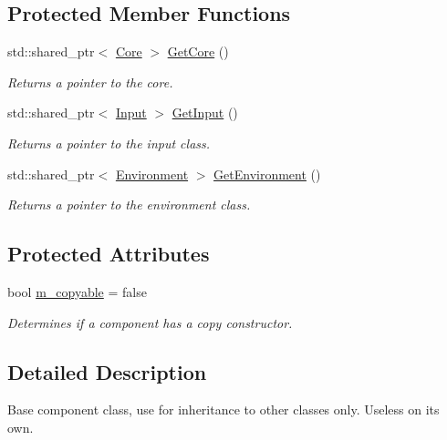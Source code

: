 \subsection*{Protected Member Functions}
\begin{DoxyCompactItemize}
\item 
std\+::shared\+\_\+ptr$<$ \hyperlink{classfrontier_1_1_core}{Core} $>$ \hyperlink{classfrontier_1_1_component_a0006685ddaadb379360f7f28294d3806}{Get\+Core} ()
\begin{DoxyCompactList}\small\item\em Returns a pointer to the core. \end{DoxyCompactList}\item 
std\+::shared\+\_\+ptr$<$ \hyperlink{classfrontier_1_1_input}{Input} $>$ \hyperlink{classfrontier_1_1_component_a25cc51fb97b0b4c5dad1401707d530ea}{Get\+Input} ()
\begin{DoxyCompactList}\small\item\em Returns a pointer to the input class. \end{DoxyCompactList}\item 
std\+::shared\+\_\+ptr$<$ \hyperlink{classfrontier_1_1_environment}{Environment} $>$ \hyperlink{classfrontier_1_1_component_a24846c0ac8d4d607aff483ed7ffdf5f8}{Get\+Environment} ()
\begin{DoxyCompactList}\small\item\em Returns a pointer to the environment class. \end{DoxyCompactList}\end{DoxyCompactItemize}
\subsection*{Protected Attributes}
\begin{DoxyCompactItemize}
\item 
bool \hyperlink{classfrontier_1_1_component_ad15af6da45dff3b37abb83bd5697fd87}{m\+\_\+copyable} = false
\begin{DoxyCompactList}\small\item\em Determines if a component has a copy constructor. \end{DoxyCompactList}\end{DoxyCompactItemize}


\subsection{Detailed Description}
Base component class, use for inheritance to other classes only. Useless on its own. 

